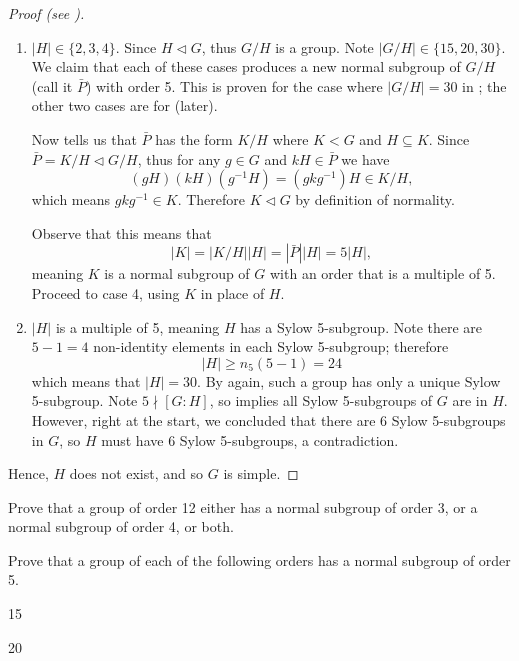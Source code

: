 \begin{proof}[Proof (see {\cite[Proposition 4.21]{dummit_foote_2004}})]
\begin{enumerate}
        \item $|H| \in \{2, 3, 4\}$. Since $H \lhd G$, thus $G/H$ is a group. Note $|G/H| \in \{15, 20, 30\}$. We claim that each of these cases produces a new normal subgroup of $G/H$ (call it $\bar{P}$) with order 5. This is proven for the case where $|G/H| = 30$ in ; the other two cases are for  (later).

        Now  tells us that $\bar{P}$ has the form $K/H$ where $K < G$ and $H \subseteq K$. Since $\bar{P} = K/H \lhd G/H$, thus for any $g \in G$ and $kH \in \bar{P}$ we have
        \[
            (gH)(kH)(g^{-1}H) = (gkg^{-1})H \in K/H,
        \]
        which means $gkg^{-1} \in K$. Therefore $K \lhd G$ by definition of normality.

        Observe that this means that
        \[
            |K| = |K/H||H| = |\bar{P}||H| = 5|H|,
        \]
        meaning $K$ is a normal subgroup of $G$ with an order that is a multiple of 5. Proceed to case 4, using $K$ in place of $H$.

        \item $|H|$ is a multiple of 5, meaning $H$ has a Sylow 5-subgroup. Note there are $5-1=4$ non-identity elements in each Sylow 5-subgroup; therefore
        \[
            |H| \geq n_5(5-1) = 24
        \]
        which means that $|H| = 30$. By  again, such a group has only a unique Sylow 5-subgroup.  Note $5 \nmid [G:H]$, so  implies all Sylow 5-subgroups of $G$ are in $H$. However, right at the start, we concluded that there are 6 Sylow 5-subgroups in $G$, so $H$ must have 6 Sylow 5-subgroups, a contradiction.
    \end{enumerate}
    Hence, $H$ does not exist, and so $G$ is simple.
\end{proof}

\begin{exercise}\label{exercise-group-of-order-12-has-normal-subgroup-of-3-or-4}
    Prove that a group of order 12 either has a normal subgroup of order 3, or a normal subgroup of order 4, or both.
\end{exercise}

\begin{exercise}\label{exercise-group-of-order-15-or-20-has-normal-subgroup-of-order-5}
    Prove that a group of each of the following orders has a normal subgroup of order 5.
    \begin{partquestions}{\alph*}
        \item 15
        \item 20
    \end{partquestions}
\end{exercise}


